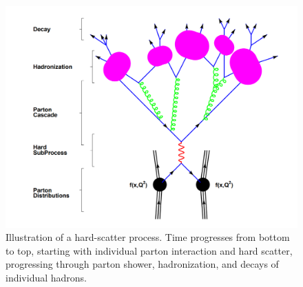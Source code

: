 \begin{figure}
\centering
\includegraphics[width=0.6\linewidth]{plots/SM/evtgenerator.PNG}
\caption{Illustration of a hard-scatter process. Time progresses from bottom to top, starting with individual parton interaction and hard scatter, progressing through parton shower, hadronization, and decays of individual hadrons. \protect\cite{Dobbs:2001ck}}
\label{fig:sm:evtgen}
\end{figure}